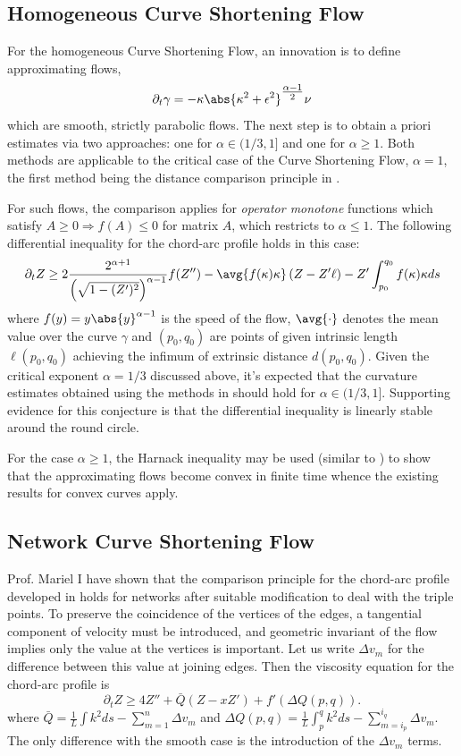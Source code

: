 \documentclass[12pt]{amsart}
\begin{document}
\subsection*{Homogeneous Curve Shortening Flow}
\label{sec-3-2}

For the homogeneous Curve Shortening Flow, an innovation is to define approximating flows,
\[
\partial_t \gamma = -\kappa\abs{\kappa^2 + \epsilon^2}^{\tfrac{\alpha-1}{2}} \nu
\]
which are smooth, strictly parabolic flows. The next step is to obtain a priori estimates via two approaches: one for $\alpha \in (1/3, 1]$ and one for $\alpha \geq 1$. Both methods are applicable to the critical case of the Curve Shortening Flow, $\alpha = 1$, the first method being the distance comparison principle in \cite{MR2794630}.

For such flows, the comparison applies for \emph{operator monotone} functions which satisfy $A \geq 0 \Rightarrow f(A) \leq 0$ for matrix $A$, which restricts to $\alpha \leq 1$. The following differential inequality for the chord-arc profile holds in this case:
\[
\partial_t Z \geq 2 \frac{2^{\alpha+1}}{\left(\sqrt{1 - (Z')^2}\right)^{\alpha-1}} f(Z'') - \avg{f(\kappa) \kappa} \left(Z - Z'\ell\right) - Z' \int_{p_0}^{q_0} f(\kappa)\kappa ds
\]
where $f(y) = y\abs{y}^{\alpha-1}$ is the speed of the flow, $\avg{\cdot}$ denotes the mean value over the curve $\gamma$ and $(p_0, q_0)$ are points of given intrinsic length $\ell(p_0, q_0)$ achieving the infimum of extrinsic distance $d(p_0, q_0)$. Given the critical exponent $\alpha=1/3$ discussed above, it's expected that the curvature estimates obtained using the methods in \cite{MR2794630} should hold for $\alpha \in (1/3, 1]$. Supporting evidence for this conjecture is that the differential inequality is linearly stable around the round circle.

For the case $\alpha \geq 1$, the Harnack inequality may be used (similar to \cite{MR1094458}) to show that the approximating flows become convex in finite time whence the existing results for convex curves apply.

\subsection*{Network Curve Shortening Flow}
\label{sec-3-3}

Prof. Mariel \saez I have shown that the comparison principle for the chord-arc profile developed in \cite{MR2794630} holds for networks after suitable modification to deal with the triple points. To preserve the coincidence of the vertices of the edges, a tangential component of velocity must be introduced, and geometric invariant of the flow implies only the value at the vertices is important. Let us write $\Delta v_m$ for the difference between this value at joining edges. Then the viscosity equation for the chord-arc profile is
\[
\partial_t Z \geq 4Z''+\bar{Q}(Z-xZ')+f'(\Delta Q(p,q)).
\]
where $\bar{Q}=\frac{1}{L}\int k^2 ds-\sum_{m=1}^n \Delta v_m$ and $\Delta Q(p,q)=\frac{1}{L}\int_p^q k^2 ds-\sum_{m=i_p}^{i_q} \Delta v_m$. The only difference with the smooth case is the introduction of the $\Delta v_m$ terms.
\end{document}
